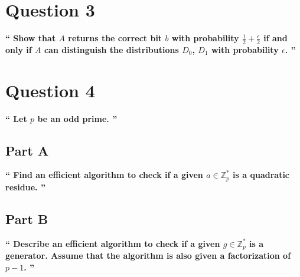 \documentclass{article}
\newcommand{\HomeworkText}[1]{\textbf{``#1''}\\}
\begin{document}
	\clearpage
	\section*{Question 3}
	\HomeworkText{
		Show that $A$ returns the correct bit $b$ with probability $\frac{1}{2} + \frac{\epsilon}{2}$ if and only if $A$ can distinguish the distributions $D_0$, $D_1$ with probability $\epsilon$.
	}
	

	\clearpage
	\section*{Question 4}
	\HomeworkText{
		Let $p$ be an odd prime.
	}
	\subsection*{Part A}
	\HomeworkText{
		Find an efficient algorithm to check if a given $a \in \mathbb{Z}^{*}_{p}$ is a quadratic residue.
	}


	\subsection*{Part B}
	\HomeworkText{
		Describe an efficient algorithm to check if a given $g \in \mathbb{Z}^{*}_{p}$ is a generator. Assume that the algorithm is also given a factorization of $p - 1$.
	}
\end{document}
